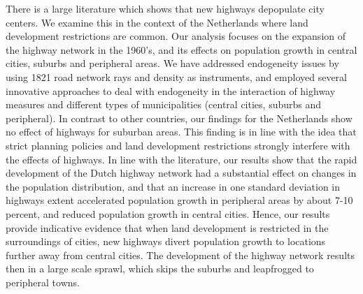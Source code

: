 \documentclass[a4paper,authoryear,review]{elsarticle}  	%
\begin{document}
	There is a large literature which shows that new highways depopulate city centers. We examine this in the context of the Netherlands where land development restrictions are common. Our analysis focuses on the expansion of the highway network in the 1960’s, and its effects on population growth in central cities, suburbs and peripheral areas. We have addressed endogeneity issues by using 1821 road network rays and density as instruments, and employed several innovative approaches to deal with endogeneity in the interaction of highway measures and different types of municipalities (central cities, suburbs and peripheral). In contrast to other countries, our findings for the Netherlands show no effect of highways for suburban areas. This finding is in line with the idea that strict planning policies and land development restrictions strongly interfere with the effects of highways. In line with the literature, our results show that the rapid development of the Dutch highway network had a substantial effect on changes in the population distribution, and that an increase in one standard deviation in highways extent accelerated population growth in peripheral areas by about 7-10 percent, and reduced population growth in central cities. Hence, our results provide indicative evidence that when land development is restricted in the surroundings of cities, new highways divert population growth to locations further away from central cities. The development of the highway network results then in a large scale sprawl, which skips the suburbs and leapfrogged to peripheral towns. 
	


\section*{} %
	\setlength{\bibsep}{0pt}
	
	

\newpage
\appendix
\renewcommand*{\thesection}{\appendixname~\Alph{section}}
\renewcommand\thetable{\Alph{section}.\arabic{table}} 
\renewcommand\thefigure{\Alph{section}.\arabic{figure}} 
\setcounter{table}{0}   
\setcounter{figure}{0}   
\end{document}

